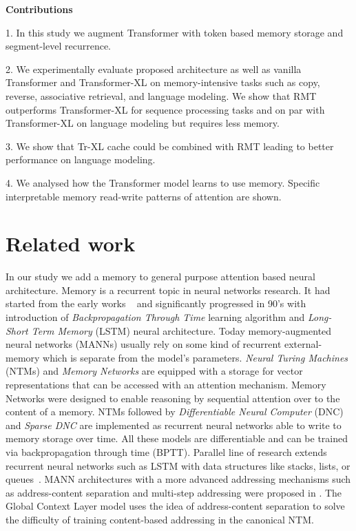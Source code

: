   \textbf{Contributions}
  
  1. In this study we augment Transformer with token based memory storage and segment-level recurrence.
  
  2. We experimentally evaluate proposed architecture as well as vanilla Transformer and Transformer-XL on memory-intensive tasks such as copy, reverse, associative retrieval, and language modeling. We show that RMT outperforms Transformer-XL for sequence processing tasks and on par with Transformer-XL on language modeling but requires less memory.
  
  3. We show that Tr-XL cache could be combined with RMT leading to better performance on language modeling.
  
  4.  We analysed how the Transformer model learns to use  memory. Specific interpretable memory read-write patterns of attention are shown.%
  
  \section{Related work}%
  
  In our study we add a memory to general purpose attention based neural architecture. Memory is a recurrent topic in neural networks research. It had started from the early works ~\cite{mcculloch1943logical,stephen1956kleene} and significantly progressed in 90's with introduction of \textit{Backpropagation Through Time} learning algorithm \cite{werbos1990backpropagation} and \textit{Long-Short Term Memory} (LSTM) \cite{10.1162/neco.1997.9.8.1735} neural architecture. Today memory-augmented neural networks (MANNs) usually rely on some kind of recurrent external-memory which is separate  from the model's parameters. \textit{Neural Turing Machines }(NTMs) \cite{graves2014neural} and \textit{Memory Networks }\cite{weston2014memory} are equipped with a storage for vector representations that can be accessed with an attention mechanism. Memory Networks \cite{weston2014memory,sukhbaatar2015endtoend} were designed to enable reasoning by sequential attention over to the content of a memory. 
  NTMs followed by \textit{Differentiable Neural Computer} (DNC) \cite{graves2016hybrid} and \textit{Sparse DNC} \cite{rae2016scaling} are implemented as recurrent neural networks able to write to memory storage over time. All these models are differentiable and can be trained via backpropagation through time (BPTT). Parallel line of research extends recurrent neural networks such as LSTM with data structures like stacks, lists, or queues~\cite{arm2015inferring,grefenstette2015learning}. MANN architectures with a more advanced addressing mechanisms such as address-content separation and multi-step addressing were proposed in \cite{gulcehre2016dynamic,gulcehre2017memory,meng2018context}. The Global Context Layer model \cite{meng2018context} uses the idea of address-content separation to solve the difficulty of training content-based addressing in the canonical NTM.
  
